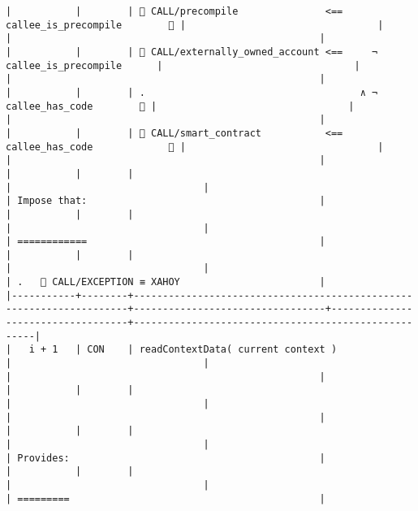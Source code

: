 \documentclass[varwidth=\maxdimen,margin=0.5cm,multi={verbatim}]{standalone}
\begin{document}
\begin{verbatim}
|           |        |  CALL/precompile               <==  callee_is_precompile        👋 |                                 |                                   |                                                     |
|           |        |  CALL/externally_owned_account <==     ¬ callee_is_precompile      |                                 |                                   |                                                     |
|           |        | .                                     ∧ ¬ callee_has_code        👋 |                                 |                                   |                                                     |
|           |        |  CALL/smart_contract           <==  callee_has_code             👋 |                                 |                                   |                                                     |
|           |        |                                                                     |                                 |                                   | Impose that:                                        |
|           |        |                                                                     |                                 |                                   | ============                                        |
|           |        |                                                                     |                                 |                                   | .    CALL/EXCEPTION ≡ XAHOY                        |
|-----------+--------+---------------------------------------------------------------------+---------------------------------+-----------------------------------+-----------------------------------------------------|
|   i + 1   | CON    | readContextData( current context )                                  |                                 |                                   |                                                     |
|           |        |                                                                     |                                 |                                   |                                                     |
|           |        |                                                                     |                                 |                                   | Provides:                                           |
|           |        |                                                                     |                                 |                                   | =========                                           |

\end{verbatim}
\end{document}
